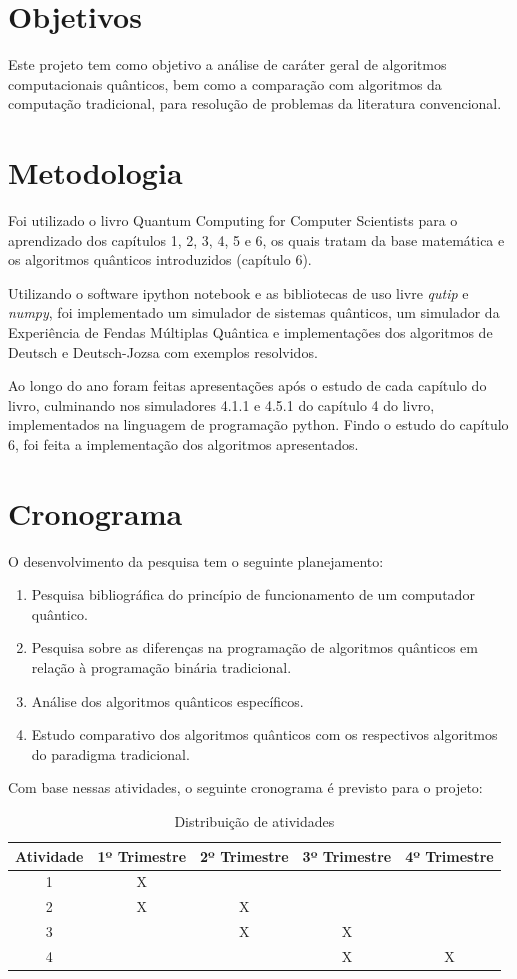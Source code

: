 \documentclass[inci,lof,loc]{imetex}
\begin{document}
\section{Objetivos}
Este projeto tem como objetivo a análise de caráter geral de algoritmos computacionais quânticos, bem como a comparação com algoritmos da computação tradicional, para resolução de problemas da literatura convencional.

\section{Metodologia}
Foi utilizado o livro Quantum Computing for Computer Scientists para o aprendizado dos capítulos 1, 2, 3, 4, 5 e 6, os quais tratam da base matemática e os algoritmos quânticos introduzidos (capítulo 6).

Utilizando o software ipython notebook e as bibliotecas de uso livre \emph{qutip} e \emph{numpy}, foi implementado um simulador de sistemas quânticos, um simulador da Experiência de Fendas Múltiplas Quântica e implementações dos algoritmos de Deutsch e Deutsch-Jozsa com exemplos resolvidos.

Ao longo do ano foram feitas apresentações após o estudo de cada capítulo do livro, culminando nos simuladores 4.1.1 e 4.5.1 do capítulo 4 do livro, implementados na linguagem de programação python. Findo o estudo do capítulo 6, foi feita a implementação dos algoritmos apresentados.

\section{Cronograma}
O desenvolvimento da pesquisa tem o seguinte planejamento:
\begin{enumerate}
\item Pesquisa bibliográfica do princípio de funcionamento de um computador quântico.
\item Pesquisa sobre as diferenças na programação de algoritmos quânticos em relação à programação binária tradicional.
\item Análise dos algoritmos quânticos específicos.
\item Estudo comparativo dos algoritmos quânticos com os respectivos algoritmos do paradigma tradicional.
\end{enumerate}
Com base nessas atividades, o seguinte cronograma é previsto para o projeto:
\begin{table}[h]
\centering
\begin{tabular}{|c|c|c|c|c|}
\hline 
Atividade & 1º Trimestre & 2º Trimestre & 3º Trimestre & 4º Trimestre \\ 
\hline 
1 & X &   &   &   \\ 
\hline 
2 & X & X &   &   \\ 
\hline 
3 &   & X & X &   \\ 
\hline 
4 &   &   & X & X \\ 
\hline 
\end{tabular}
\caption{Distribuição de atividades}
\end{table}
\end{document}
